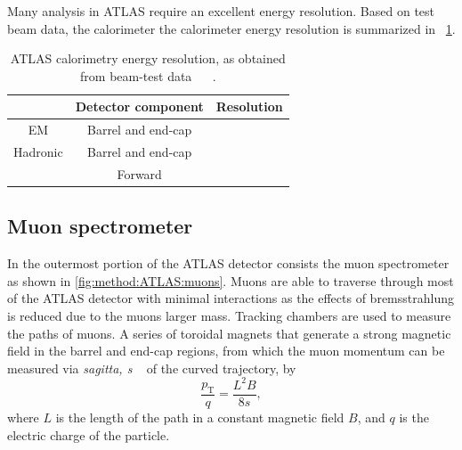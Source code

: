 Many analysis in ATLAS require an excellent energy resolution. Based on test beam data, the calorimeter the calorimeter energy resolution is summarized in ~\cref{tab:method:ATLAS:ecalperf}.

\begin{table}
    \begin{tabular}{ccc}
         & Detector component & Resolution \\
        \midrule
       EM & Barrel and end-cap & \\
       Hadronic & Barrel and end-cap &  \\
                & Forward &  \\
    \end{tabular}
    \caption[ATLAS calorimetry energy resolution]{ATLAS calorimetry energy resolution, as obtained from beam-test data ~\cite{ATLAS:testbeam-calo} ~\cite{ATLAS:testbeam-hcal}.}
    \label{tab:method:ATLAS:ecalperf}
\end{table}

\subsection{Muon spectrometer}\label{sec:method:MS}

In the outermost portion of the ATLAS detector consists the muon spectrometer~\cite{ATLAS:muon-TDR} as shown in \cref{fig:method:ATLAS:muons}. Muons are able to traverse through most of the ATLAS detector with minimal interactions as the effects of bremsstrahlung is reduced due to the muons larger mass. Tracking chambers are used to measure the paths of muons. A series of toroidal magnets that generate a strong magnetic field in the barrel and end-cap regions, from which the muon momentum can be measured via \emph{sagitta, s} ~\cite{WeissteinSagitta} of the curved trajectory, by
\begin{equation}
    \frac{p_\text{T}}{q} = \frac{L^2B}{8s},
\end{equation}
where $L$ is the length of the path in a constant magnetic field $B$, and $q$ is the electric charge of the particle.

